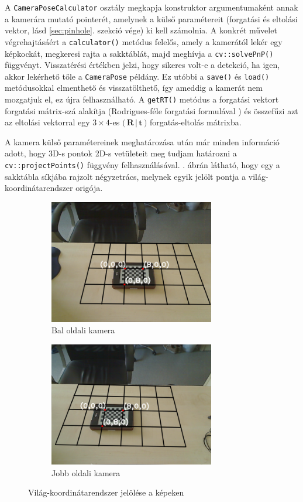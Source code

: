 A \texttt{CameraPoseCalculator} osztály megkapja konstruktor argumentumaként annak a kamerára mutató pointerét, amelynek a külső paramétereit (forgatási és eltolási vektor, lásd \ref{sec:pinhole}. szekció vége) ki kell számolnia. A konkrét művelet végrehajtásáért a \texttt{calculator()} metódus felelős, amely a kamerától lekér egy képkockát, megkeresi rajta a sakktáblát, majd meghívja a \texttt{cv::solvePnP()} függvényt. Visszatérési értékben jelzi, hogy sikeres volt-e a detekció, ha igen, akkor lekérhető tőle a \texttt{CameraPose} példány. Ez utóbbi a \texttt{save()} és \texttt{load()} metódusokkal elmenthető és visszatölthető, így ameddig a kamerát nem mozgatjuk el, ez újra felhasználható. A \texttt{getRT()} metódus a forgatási vektort forgatási mátrix-szá alakítja (Rodrigues-féle forgatási formulával \cite{camera-calib-3d}) és összefűzi azt az eltolási vektorral egy $3\times 4$-es $\Big(\,\mathbf{R}\,|\,\mathbf{t}\,\Big)$ forgatás-eltolás mátrixba.

A kamera külső paramétereinek meghatározása után már minden információ adott, hogy 3D-s pontok 2D-s vetületeit meg tudjam határozni a \texttt{cv::projectPoints()} függvény felhasználásával. . ábrán látható, hogy egy a sakktábla síkjába rajzolt négyzetrács, melynek egyik jelölt pontja a világ-koordinátarendszer origója.

\begin{figure}[tbh]
\centering
\begin{subfigure}[b]{.49\linewidth}
	\centering
	\includegraphics[width=205pt]{figures/pose0_180.png}
	\caption{Bal oldali kamera}
  \end{subfigure}
\begin{subfigure}[b]{.49\linewidth}
	\centering
	\includegraphics[width=205pt]{figures/pose1_180.png}
	\caption{Jobb oldali kamera}
  \end{subfigure}
\caption{Világ-koordinátarendszer jelölése a képeken \label{fig:pose}}
\end{figure}

